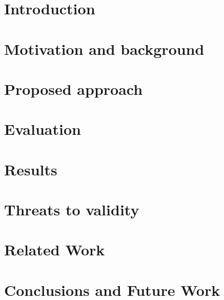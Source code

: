 \documentclass[sigconf]{acmart}
\begin{document}


\maketitle
	\section{Introduction}
\label{sec:Introduction}



\section{Motivation and background}
\label{sec:Background}







\section{Proposed approach}
\label{sec:ProposedApproach}


\section{Evaluation}		
\label{sec:Evaluation}


\section{Results}
\label{sec:ExperimentalResults}



\section{Threats to validity}
\label{sec:Threats}


\section{Related Work}
\label{sec:RelatedWorks}


\section{Conclusions and Future Work}
\label{sec:Conclusions}





\end{document}
